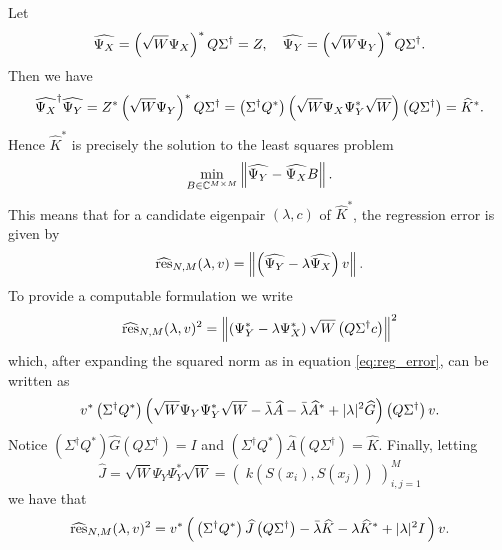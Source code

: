 Let 
\begin{equation}
    \widehat{\Psi_X} = \left( \sqrt{W} \Psi_X \right)^* Q \Sigma^\dagger = Z, \quad 
    \widehat{\Psi_Y} = \left( \sqrt{W} \Psi_Y \right)^* Q \Sigma^\dagger . 
\end{equation}
Then we have 
\begin{equation}
    \widehat{\Psi_X}^\dagger \widehat{\Psi_Y} 
    = Z^* \left( \sqrt{W} \Psi_Y \right)^* Q \Sigma^\dagger
    = \left( \Sigma^\dagger Q^* \right) \left( \sqrt{W} \Psi_X \Psi_Y^* \sqrt{W} \right) \left( Q \Sigma^\dagger \right)
    = \widehat{K}^* . 
\end{equation}
Hence $\widehat{K}^*$ is precisely the solution to the least squares problem 
\begin{equation}
    \min_{B \in \mathbb{C}^{M \times M}} \left\| \widehat{\Psi_Y} - \widehat{\Psi_X} B \right\| . 
\end{equation}
This means that for a candidate eigenpair $(\lambda, c)$ of $\widehat{K}^*$, the regression 
error is given by 
\begin{equation}
    \widehat{ \text{res} }_{N,M} (\lambda, v) 
    = \left\| \left( \widehat{ \Psi_Y } - \lambda \widehat{ \Psi_X } \right) v \right\| . 
\end{equation}
To provide a computable formulation we write
\begin{equation}
    \widehat{ \text{res} }_{N,M} (\lambda, v)^2
    = \left\| \left( \Psi_Y^* - \lambda \Psi_X^* \right) \sqrt{W}
    \left( Q \Sigma^\dagger c \right) \right\|^2 
\end{equation}
which, after expanding the squared norm as in equation \ref{eq:reg_error}, can be 
written as 
\begin{equation}
    \label{eq:res_hat_expanded}
    v^* \left( \Sigma^\dagger Q^* \right) 
    \left( 
        \sqrt{W} \Psi_Y \Psi_Y^* \sqrt{W} 
        - \bar{\lambda} \widehat{ A } 
        - \bar{\lambda} \widehat{ A }^* 
        + | \lambda |^2 \widehat{ G }
    \right)
    \left( Q \Sigma^\dagger \right) v . 
\end{equation}
Notice $\left( \Sigma^\dagger Q^* \right) \widehat{ G } \left( Q \Sigma^\dagger \right) 
= I$ and $\left( \Sigma^\dagger Q^* \right) \widehat{ A } \left( Q \Sigma^\dagger \right) 
= \widehat{ K }$. Finally, letting 
\begin{equation}
    \label{eq:J_hat}
    \widehat{ J } = 
    \sqrt{W} \Psi_Y \Psi_Y^* \sqrt{W}
    = \left(\; k(S(x_i), S(x_j)) \;\right)_{i, j=1}^M 
\end{equation}
we have that 
\begin{equation}
    \label{eq:res_hat_min}
    \widehat{ \text{res} }_{N,M} (\lambda, v)^2
    = v^* \left(\, 
        \left( \Sigma^\dagger Q^* \right) \widehat{ J } \left( Q \Sigma^\dagger \right)
        - \bar{\lambda} \widehat{ K } 
        - \lambda \widehat{ K }^* 
        + | \lambda |^2 I
    \,\right) v . 
\end{equation}

